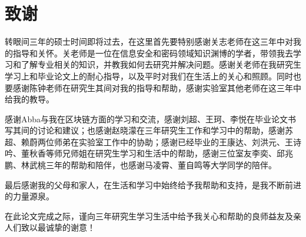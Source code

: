 
\chapter{致谢}

转眼间三年的硕士时间即将过去，在这里首先要特别感谢关志老师在这三年中对我的指导和关怀。关老师是一位在信息安全和密码领域知识渊博的学者，带领我去学习和了解专业相关的知识，并教我如何去研究并解决问题。感谢关老师在我研究生学习上和毕业论文上的耐心指导，以及平时对我们在生活上的关心和照顾。同时也要感谢陈钟老师在研究生其间对我的指导和帮助，感谢实验室其他老师在这三年中给我的教导。

感谢Abba与我在区块链方面的学习和交流，感谢刘超、王珂、李悦在毕业论文书写其间的讨论和建议；也感谢赵晓濛在三年研究生工作和学习中的帮助，感谢苏超、赖蔚两位师弟在实验室工作中的协助；感谢已经毕业的王康达、刘洪元、王诗吟、董秋香等师兄师姐在研究生学习和生活中的帮助，感谢三位室友李奕、邱兆鹏、林武桃三年的帮助和陪伴，也感谢马凌霄、董自鸣等大学同学的陪伴。

最后感谢我的父母和家人，在生活和学习中始终给予我帮助和支持，是我不断前进的力量源泉。

在此论文完成之际，谨向三年研究生学习生活中给予我关心和帮助的良师益友及亲人们致以最诚挚的谢意！





